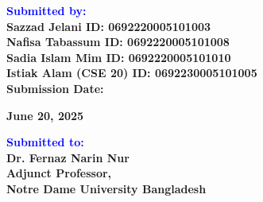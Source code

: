 \documentclass[12pt]{report}
\begin{document}
\begin{titlepage}
\begin{center}
    \vspace{1em}
    \begin{flushleft}
        \textbf{\Huge \textcolor{blue}{Submitted by:}} \\
        \vspace{0.3cm}
        \textbf{\Large Sazzad Jelani \hspace{3.9cm} ID: 0692220005101003} \\
        \vspace{0.3cm}
        \textbf{\Large Nafisa Tabassum \hspace{3cm} ID: 0692220005101008} \\
		\vspace{0.3cm}
		\textbf{\Large Sadia Islam Mim \hspace{3cm} ID: 0692220005101010} \\
		\vspace{0.3cm}        
        \textbf{\Large Istiak Alam (CSE 20) \hspace{1.9cm} ID: 0692230005101005} \\
        \vspace{0.5cm}
        \textbf{\Large Submission Date: }{\Large \textbf{June 20, 2025}\par}
    \end{flushleft}
    \vfill
    \begin{flushleft}
        \textbf{\Huge \textcolor{blue}{Submitted to:}} \\
        \vspace{0.3cm}
        \textbf{\Large Dr. Fernaz Narin Nur} \\
        \vspace{0.3cm}
        \textbf{\Large Adjunct Professor,} \\
        \vspace{0.3cm}
        \textbf{\Large Notre Dame University Bangladesh}
    \end{flushleft}
\end{center}
\end{titlepage}						%
\end{document}
